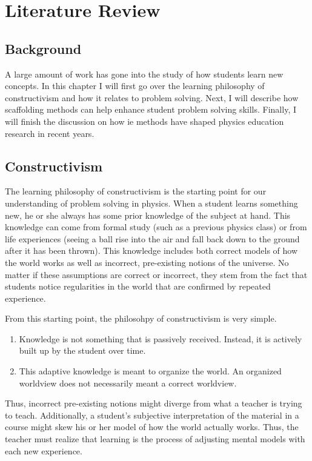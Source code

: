 \chapter[Literature Review]{Literature Review}

\section{Background}

A large amount of work has gone into the study of how students learn new concepts. In this chapter I will first go over the learning philosophy of constructivism and how it relates to problem solving. Next, I will describe how scaffolding methods can help enhance student problem solving skills. Finally, I will finish the discussion on how \gls{ie} methods have shaped physics education research in recent years.

\section{Constructivism}

The learning philosophy of constructivism is the starting point for our understanding of problem solving in physics. When a student learns something new, he or she always has some prior knowledge of the subject at hand. This knowledge can come from formal study (such as a previous physics class) or from life experiences (seeing a ball rise into the air and fall back down to the ground after it has been thrown). This knowledge includes both correct models of how the world works as well as incorrect, pre-existing notions of the universe. No matter if these assumptions are correct or incorrect, they stem from the fact that students notice regularities in the world that are confirmed by repeated experience\cite{vonGlasersfeld1983}.

From this starting point, the philosohpy of constructivism is very simple.

\begin{enumerate}
\item Knowledge is not something that is passively received. Instead, it is actively built up by the student over time.
\item This adaptive knowledge is meant to organize the world. An organized worldview does not necessarily meant a correct worldview.
\end{enumerate}

Thus, incorrect pre-existing notions might diverge from what a teacher is trying to teach. Additionally, a student's subjective interpretation of the material in a course might skew his or her model of how the world actually works\cite{vonGlasersfeld1989}. Thus, the teacher must realize that learning is the process of adjusting mental models with each new experience.

